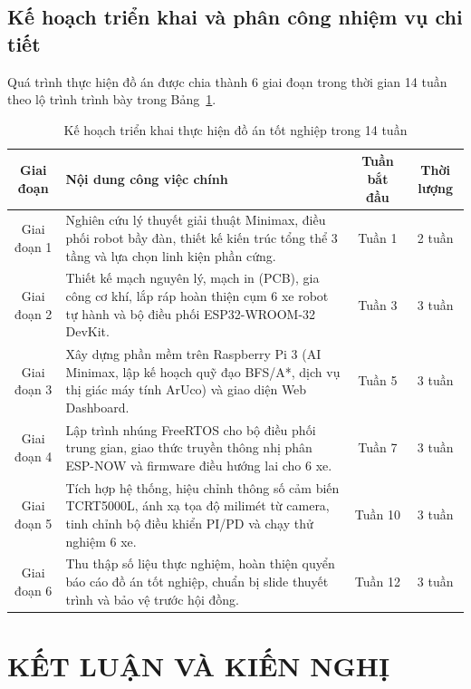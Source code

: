 \documentclass[12pt,a4paper]{report}
\newcommand{\tablefont}{\fontsize{12pt}{15pt}\selectfont}
\begin{document}
	
	\section{Kế hoạch triển khai và phân công nhiệm vụ chi tiết}
	Quá trình thực hiện đồ án được chia thành 6 giai đoạn trong thời gian 14 tuần theo lộ trình trình bày trong Bảng~\ref{tab:ke_hoach_14_tuan}.
	
	\begin{table}[h!]
		\centering
		\tablefont
		\caption{Kế hoạch triển khai thực hiện đồ án tốt nghiệp trong 14 tuần}
		\label{tab:ke_hoach_14_tuan}
		\renewcommand{\arraystretch}{1.25}
		\begin{tabular}{|c|p{7.2cm}|c|c|}
			\hline
			\textbf{Giai đoạn} & \textbf{Nội dung công việc chính} & \textbf{Tuần bắt đầu} & \textbf{Thời lượng} \\
			\hline
			Giai đoạn 1 & Nghiên cứu lý thuyết giải thuật Minimax, điều phối robot bầy đàn, thiết kế kiến trúc tổng thể 3 tầng và lựa chọn linh kiện phần cứng. & Tuần 1 & 2 tuần \\
			\hline
			Giai đoạn 2 & Thiết kế mạch nguyên lý, mạch in (PCB), gia công cơ khí, lắp ráp hoàn thiện cụm 6 xe robot tự hành và bộ điều phối ESP32-WROOM-32 DevKit. & Tuần 3 & 3 tuần \\
			\hline
			Giai đoạn 3 & Xây dựng phần mềm trên Raspberry Pi 3 (AI Minimax, lập kế hoạch quỹ đạo BFS/A*, dịch vụ thị giác máy tính ArUco) và giao diện Web Dashboard. & Tuần 5 & 3 tuần \\
			\hline
			Giai đoạn 4 & Lập trình nhúng FreeRTOS cho bộ điều phối trung gian, giao thức truyền thông nhị phân ESP-NOW và firmware điều hướng lai cho 6 xe. & Tuần 7 & 3 tuần \\
			\hline
			Giai đoạn 5 & Tích hợp hệ thống, hiệu chỉnh thông số cảm biến TCRT5000L, ánh xạ tọa độ milimét từ camera, tinh chỉnh bộ điều khiển PI/PD và chạy thử nghiệm 6 xe. & Tuần 10 & 3 tuần \\
			\hline
			Giai đoạn 6 & Thu thập số liệu thực nghiệm, hoàn thiện quyển báo cáo đồ án tốt nghiệp, chuẩn bị slide thuyết trình và bảo vệ trước hội đồng. & Tuần 12 & 3 tuần \\
			\hline
		\end{tabular}
	\end{table}
	
	\clearpage
	\chapter*{KẾT LUẬN VÀ KIẾN NGHỊ}
	
\end{document}
